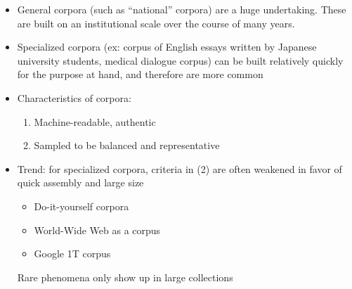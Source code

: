 \documentclass[a4paper,landscape,headrule,footrule,xetex]{foils}
\begin{document}
\begin{itemize}
\item General corpora (such as “national” corpora) are a huge undertaking.
These are built on an institutional scale over the course of many years.
\item  Specialized corpora (ex: corpus of English essays written by Japanese
university students, medical dialogue corpus) can be built relatively
quickly for the purpose at hand, and therefore are more common
\item Characteristics of corpora:
  \begin{enumerate}
  \item Machine-readable, authentic
  \item Sampled to be balanced and representative
  \end{enumerate}
\newpage
\item  Trend: for specialized corpora, criteria in (2) are often weakened in favor of quick assembly and large size
  \begin{itemize}
  \item Do-it-yourself corpora
  \item World-Wide Web as a corpus
  \item Google 1T corpus
  \end{itemize}
 Rare phenomena only show up in large collections
\end{itemize}
\end{document}
